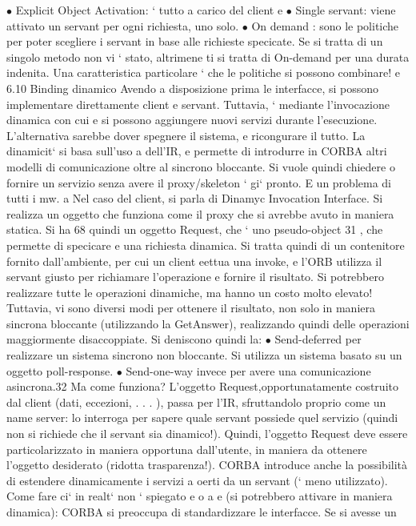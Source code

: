 \documentclass[a4paper,12pt]{article}
\begin{document}
$\bullet$ Explicit Object Activation: ` tutto a carico del client
e
$\bullet$ Single servant: viene attivato un servant per ogni richiesta, uno solo.
$\bullet$ On demand : sono le politiche per poter scegliere i servant in base alle richieste specicate. Se si tratta di
un singolo metodo non vi ` stato, altrimene
ti si tratta di On-demand per una durata indenita. Una caratteristica
particolare ` che le politiche si possono combinare!
e
6.10
Binding dinamico
Avendo a disposizione prima le interfacce, si possono implementare direttamente client e servant. Tuttavia, ` mediante
l'invocazione dinamica con cui
e
si possono aggiungere nuovi servizi durante l'esecuzione. L'alternativa sarebbe
dover spegnere il sistema, e ricongurare il tutto. La dinamicit` si basa sull'uso
a
dell'IR, e permette di introdurre in CORBA altri modelli di comunicazione oltre
al sincrono bloccante.
Si vuole quindi chiedere o fornire un servizio senza avere il proxy/skeleton
`
gi` pronto. E un problema di tutti i mw.
a
Nel caso del client, si parla di Dinamyc Invocation Interface. Si realizza un
oggetto che funziona come il proxy che si avrebbe avuto in maniera statica. Si ha
68
\newpage
quindi un oggetto Request, che ` uno pseudo-object 31 , che permette di specicare
e
una richiesta dinamica. Si tratta quindi di un contenitore fornito dall'ambiente,
per cui un client eettua una invoke, e l'ORB utilizza il servant giusto per
richiamare l'operazione e fornire il risultato. Si potrebbero realizzare tutte le
operazioni dinamiche, ma hanno un costo molto elevato! Tuttavia, vi sono
diversi modi per ottenere il risultato, non solo in maniera sincrona bloccante
(utilizzando la GetAnswer), realizzando quindi delle operazioni maggiormente
disaccoppiate. Si deniscono quindi la:
$\bullet$ Send-deferred per realizzare un sistema sincrono non bloccante. Si utilizza
un sistema basato su un oggetto poll-response.
$\bullet$ Send-one-way invece per avere una comunicazione asincrona.32
Ma come funziona? L'oggetto Request,opportunatamente costruito dal client
(dati, eccezioni, . . . ), passa per l'IR, sfruttandolo proprio come un name server: lo interroga per sapere quale
servant possiede quel servizio (quindi non si
richiede che il servant sia dinamico!). Quindi, l'oggetto Request deve essere particolarizzato in maniera opportuna
dall'utente, in maniera da ottenere l'oggetto
desiderato (ridotta trasparenza!).
CORBA introduce anche la possibilità di estendere dinamicamente i servizi
a
oerti da un servant (` meno utilizzato). Come fare ci` in realt` non ` spiegato
e
o
a
e
(si potrebbero attivare in maniera dinamica): CORBA si preoccupa di standardizzare le interfacce. Se si avesse un
\end{document}
